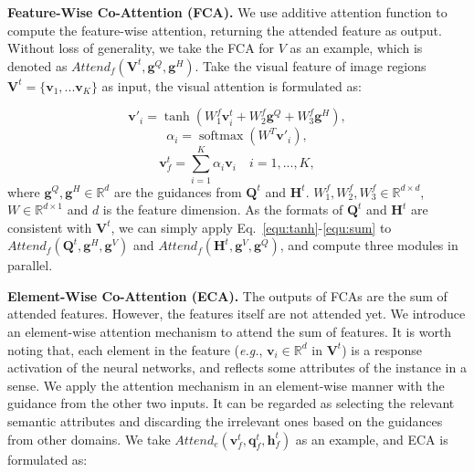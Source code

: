 \documentclass[10pt,twocolumn,letterpaper]{article}
\DeclareMathOperator*{\softmax}{softmax}
\begin{document}
\noindent\textbf{Feature-Wise Co-Attention (FCA).} We use additive attention function to compute the feature-wise attention, returning the attended feature as output. Without loss of generality, we take the FCA for $V$ as an example, which is denoted as $Attend_f(\bm{V}^t, \bm{g}^Q, \bm{g}^H)$. Take the visual feature of image regions $\bm{V}^t=\{\bm{v}_1,...\bm{v}_K\}$ as input, the visual attention is formulated as: 

\begin{equation}
    \bm{v}'_{i}=\tanh(W_{1}^{f}\bm{v}^t_{i}+W_{2}^{f}\bm{g}^Q+W_{3}^{f}\bm{g}^H),\label{equ:tanh}
\end{equation}
\begin{equation}
    \alpha_{i}=\softmax(W^{T}\bm{v}'_{i}),\label{equ:softmax}
\end{equation}
\begin{equation}
    \bm{v}^t_f=\sum_{i=1}^{K} \alpha_{i} \bm{v}_{i} \quad i=1,...,K,\label{equ:sum}
\end{equation}
where $\bm{g}^Q, \bm{g}^H \in \mathbb{R}^{d}$ are the guidances from $\bm{Q}^t$ and $\bm{H}^t$. $W_1^{f}, W_2^{f}, W_3^{f} \in \mathbb{R}^{d \times d}$, $W \in \mathbb{R}^{d \times 1}$ and $d$ is the feature dimension. As the formats of $\bm{Q}^t$ and $\bm{H}^t$ are consistent with $\bm{V}^t$, we can simply apply Eq.~\eqref{equ:tanh}-\eqref{equ:sum} to $Attend_f(\bm{Q}^t, \bm{g}^H, \bm{g}^V)$ and $Attend_f(\bm{H}^{t}, \bm{g}^V, \bm{g}^Q)$, and compute three modules in parallel.

\noindent\textbf{Element-Wise Co-Attention (ECA).} The outputs of FCAs are the sum of attended features. However, the features itself are not attended yet. We introduce an element-wise attention mechanism to attend the sum of features. It is worth noting that, each element in the feature (\emph{e.g.}, $\bm{v}_{i} \in \mathbb{R}^d$ in $\bm{V}^t$) is a response activation of the neural networks, and reflects some attributes of the instance in a sense. We apply the attention mechanism in an element-wise manner with the guidance from the other two inputs. It can be regarded as selecting the relevant semantic attributes and discarding the irrelevant ones based on the guidances from other domains. We take $Attend_e(\bm{v}^t_f, \bm{q}^t_f, \bm{h}^t_f)$ as an example, and ECA is formulated as:
\end{document}
